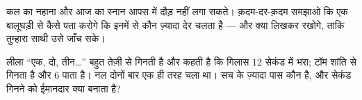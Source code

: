 \begin{exercise}[$\star\star$]\label{exo:g2:measuring-time:9}
कल का नहाना और आज का स्नान आपस में दौड़ नहीं लगा सकते। क़दम-दर-क़दम
समझाओ कि एक बालूघड़ी से कैसे पता करोगे कि इनमें से कौन ज़्यादा देर
चलता है --- और क्या लिखकर रखोगे, ताकि तुम्हारा साथी उसे जाँच सके।
\end{exercise}

\begin{exercise}[$\star\star$]\label{exo:g2:measuring-time:10}
लीला ``एक, दो, तीन\dots'' बहुत तेज़ी से गिनती है और कहती है कि गिलास
$12$ सेकंड में भरा; टॉम शांति से गिनता है और $6$ पाता है। नल दोनों
बार एक ही तरह चला था। सच के ज़्यादा पास कौन है, और सेकंड गिनने को
ईमानदार क्या बनाता है?
\end{exercise}

